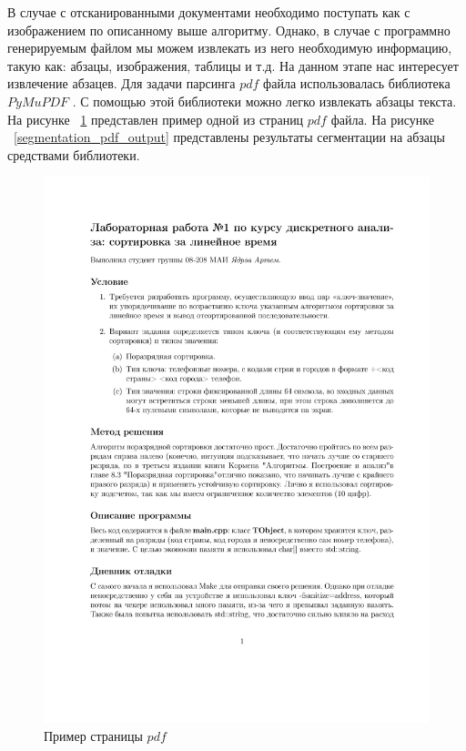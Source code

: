 В случае с отсканированными документами необходимо поступать как с изображением по описанному выше алгоритму. Однако, в случае с программно генерируемым файлом мы можем извлекать из него необходимую информацию, такую как: абзацы, изображения, таблицы и т.д.
На данном этапе нас интересует извлечение абзацев. Для задачи парсинга $pdf$ файла использовалась библиотека $PyMuPDF$ \cite{PyMuPDF}. С помощью этой библиотеки можно легко извлекать абзацы текста. На рисунке ~\ref{segmentation_pdf_input} представлен пример одной из страниц $pdf$ файла. На рисунке ~\ref{segmentation_pdf_output} представлены результаты сегментации на абзацы средствами библиотеки.
\begin{figure}
    \includegraphics[scale=0.65]{img/paragraph/pdf_input.jpg}
    \caption{Пример страницы $pdf$}
    \label{segmentation_pdf_input}
\end{figure}

